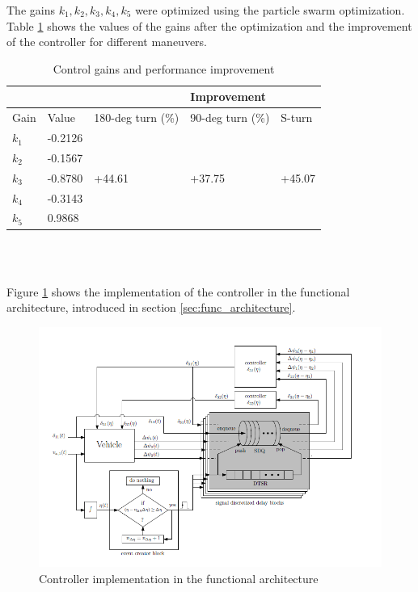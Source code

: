 \documentclass[ExampleMasters.tex]{subfiles}
\begin{document}
The gains $k_1, k_2, k_3, k_4, k_5$ were optimized using the particle swarm optimization.
Table \ref{tab:gains_after_optimization} shows the values of the gains after the optimization and the improvement of the controller for different maneuvers.
\begin{table}[h]
	\centering
	\caption{Control gains and performance improvement}
	\label{tab:gains_after_optimization}
	\begin{tabular}{l|l|l l l}
		& &  & Improvement  \\ \hline
		Gain & Value & 180-deg turn (\%) & 90-deg turn (\%) & S-turn\\ \hline
		$k_1$   &       -0.2126      &             \\
		$k_2$    &            -0.1567 &             \\
		$k_3$  &      -0.8780       &           +44.61 & +37.75 & +45.07  \\
		$k_4$ &      -0.3143       &           \\
		$k_5$  & 0.9868 & \\
		
	\end{tabular} \\
\end{table}\\
Figure \ref{fig:low_speed_diagram} shows the implementation of the controller in the functional architecture, introduced in section \ref{sec:func_architecture}.

\begin{figure}[!htb]
	\centering
	\includegraphics[width=1.0\linewidth]{figures/Low_speed_diagram}
	\caption{Controller implementation in the functional architecture \cite{Low-speed_paper}}
	\label{fig:low_speed_diagram}
\end{figure}
\end{document}
